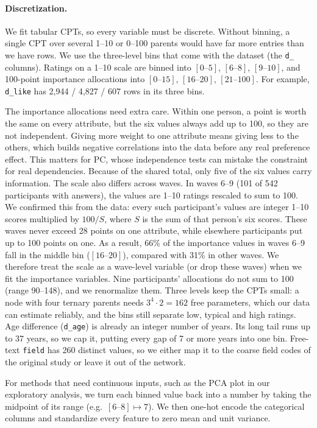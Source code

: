 \documentclass{article}
\begin{document}
\paragraph{Discretization.}
We fit tabular CPTs, so every variable must be discrete. Without binning, a
single CPT over several 1--10 or 0--100 parents would have far more entries
than we have rows. We use the three-level bins that come with the
dataset (the \texttt{d\_} columns). Ratings on a 1--10 scale are binned into
$[0\text{--}5]$, $[6\text{--}8]$, $[9\text{--}10]$, and 100-point
importance allocations into $[0\text{--}15]$, $[16\text{--}20]$, $[21\text{--}100]$.
For example, \texttt{d\_like} has 2,944 / 4,827 / 607 rows in its three bins.

The importance allocations need extra care. Within one person, a point is
worth the same on every attribute, but the six values always add up to 100, so
they are not independent. Giving more weight to one attribute means giving less
to the others, which builds negative correlations into the data before any real
preference effect. This matters for PC, whose independence tests can mistake the
constraint for real dependencies. Because of the shared total, only five of the
six values carry information.
The scale also differs across waves. In waves 6--9 (101 of 542 participants with
answers), the values are 1--10 ratings rescaled to sum to 100. We confirmed this
from the data: every such participant's values are integer 1--10 scores
multiplied by $100/S$, where $S$ is the sum of that person's six scores. These
waves never exceed 28 points on one attribute, while elsewhere participants put
up to 100 points on one. As a result, 66\% of the importance values in waves 6--9
fall in the middle bin ($[16\text{--}20]$), compared with 31\% in other waves.
We therefore treat the scale as a wave-level variable (or drop these
waves) when we fit the importance variables. Nine participants' allocations do
not sum to 100 (range 90--148), and we renormalize them.
Three levels keep the CPTs small: a node with four ternary parents needs
$3^4\cdot 2 = 162$ free parameters, which our data can estimate reliably,
and the bins still separate low, typical and high ratings. Age difference
(\texttt{d\_age}) is already an integer number of years. Its long tail runs up to 37 years,
so we cap it, putting every gap of 7 or more years into one bin. Free-text \texttt{field} has 260 distinct values,
so we either map it to the coarse field codes of the original study or leave
it out of the network.

For methods that need continuous inputs, such as the PCA plot in our
exploratory analysis,
we turn each binned value back into a number by taking the midpoint of its
range (e.g.\ $[6\text{--}8] \mapsto 7$). We then one-hot encode the categorical columns and
standardize every feature to zero mean and unit variance.
\end{document}
